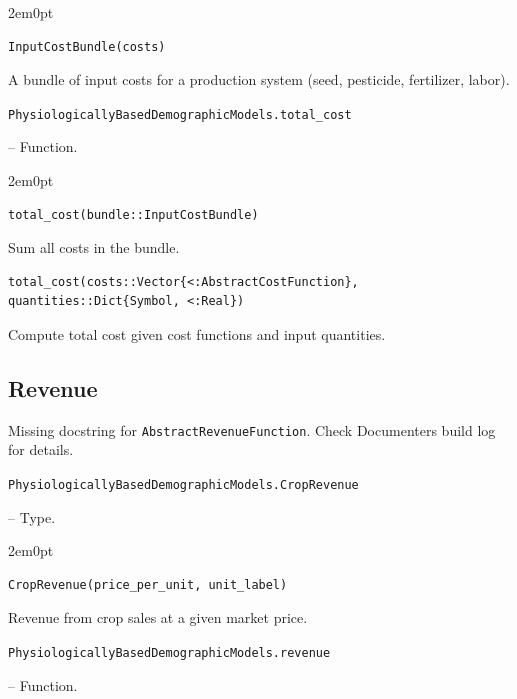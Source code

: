 \begin{adjustwidth}{2em}{0pt}


\begin{verbatim}
InputCostBundle(costs)
\end{verbatim}

A bundle of input costs for a production system (seed, pesticide, fertilizer, labor).



\end{adjustwidth}
\hypertarget{2088653978848182895}{\texttt{PhysiologicallyBasedDemographicModels.total\_cost}}  -- {Function.}

\begin{adjustwidth}{2em}{0pt}


\begin{verbatim}
total_cost(bundle::InputCostBundle)
\end{verbatim}

Sum all costs in the bundle.




\begin{verbatim}
total_cost(costs::Vector{<:AbstractCostFunction}, quantities::Dict{Symbol, <:Real})
\end{verbatim}

Compute total cost given cost functions and input quantities.



\end{adjustwidth}

\subsection{Revenue}



\label{13408208147608322719}{}


\begin{tcolorbox}[toptitle=-1mm,bottomtitle=1mm,colback=admonition-warning!50!white,colframe=admonition-warning,title=\textbf{Missing docstring.}]
Missing docstring for \texttt{AbstractRevenueFunction}. Check Documenter{\textquotesingle}s build log for details.

\end{tcolorbox}

\hypertarget{17141783396885755187}{\texttt{PhysiologicallyBasedDemographicModels.CropRevenue}}  -- {Type.}

\begin{adjustwidth}{2em}{0pt}


\begin{verbatim}
CropRevenue(price_per_unit, unit_label)
\end{verbatim}

Revenue from crop sales at a given market price.



\end{adjustwidth}
\hypertarget{4007607795333107205}{\texttt{PhysiologicallyBasedDemographicModels.revenue}}  -- {Function.}

